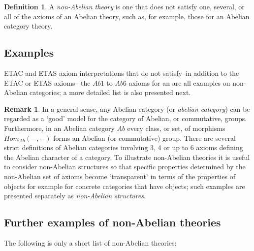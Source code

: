 \documentclass[12pt]{article}
\theoremstyle{plain}
\theoremstyle{definition}
\newtheorem{definition}{Definition}[section]
\newtheorem{remark}{Remark}[section]
\numberwithin{equation}{section}
\begin{document}
\begin{definition}
A {\em non-Abelian theory} is one that does not satisfy one, several, or all of the axioms
of an Abelian theory, such as, for example, those for an Abelian category theory. 
\end{definition}

\subsection{Examples}  
ETAC and ETAS axiom interpretations that do not satisfy--in addition to the ETAC or ETAS axioms-- the $Ab1$ to $Ab6$ axioms for an  are all examples on non-Abelian categories; a more detailed list is also presented next.

\begin{remark}
 In a general sense, any Abelian category (or {\em abelian category}) can be regarded as a `good' model for the category of Abelian, or commutative, groups. Furthermore, in an Abelian category $Ab$ every class, or set, of morphisms
$Hom_{Ab}(-,-)$ forms an Abelian (or commutative) group. There are several strict definitions of Abelian
categories involving 3, 4 or up to 6 axioms defining the Abelian character of a category. 
To illustrate non-Abelian theories it is useful to consider non-Abelian structures so that
specific properties determined by the non-Abelian set of axioms become `transparent' in terms
of the properties of objects for example for concrete categories that have objects; such examples
are presented separately as {\em non-Abelian structures}. 
\end{remark}

\subsection{Further examples of non-Abelian theories}

 The following is only a short list of non-Abelian theories:
\end{document}
